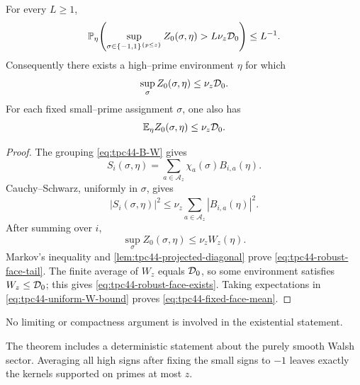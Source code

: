 \begin{theorem}
\label{thm:tpc44-robust-face}
For every \(L\ge1\),
\begin{equation}
 \mathbb P_\eta\!\left(
  \sup_{\sigma\in\{-1,1\}^{\{p\le z\}}}
  Z_0(\sigma,\eta)>L\nu_z\mathcal D_0
 \right)
 \le L^{-1}.
 \label{eq:tpc44-robust-face-tail}
\end{equation}
Consequently there exists a high--prime environment \(\eta\) for which
\begin{equation}
 \sup_\sigma Z_0(\sigma,\eta)\le\nu_z\mathcal D_0.
 \label{eq:tpc44-robust-face-exists}
\end{equation}
For each fixed small--prime assignment \(\sigma\), one also has
\begin{equation}
 \mathbb E_\eta Z_0(\sigma,\eta)\le\nu_z\mathcal D_0.
 \label{eq:tpc44-fixed-face-mean}
\end{equation}
\end{theorem}

\begin{proof}
The grouping \eqref{eq:tpc44-B-W} gives
\begin{equation}
 S_i(\sigma,\eta)
 =\sum_{a\in\mathcal A_z}\chi_a(\sigma)B_{i,a}(\eta).
 \label{eq:tpc44-grouped-coordinate}
\end{equation}
Cauchy--Schwarz, uniformly in \(\sigma\), gives
\begin{equation}
 |S_i(\sigma,\eta)|^2
 \le \nu_z\sum_{a\in\mathcal A_z}|B_{i,a}(\eta)|^2.
 \label{eq:tpc44-coordinate-Cauchy}
\end{equation}
After summing over \(i\),
\begin{equation}
 \sup_\sigma Z_0(\sigma,\eta)\le\nu_zW_z(\eta).
 \label{eq:tpc44-uniform-W-bound}
\end{equation}
Markov's inequality and \cref{lem:tpc44-projected-diagonal} prove
\eqref{eq:tpc44-robust-face-tail}.  The finite average of \(W_z\)
equals \(\mathcal D_0\), so some environment satisfies \(W_z\le\mathcal D_0\); this gives
\eqref{eq:tpc44-robust-face-exists}.  Taking expectations in
\eqref{eq:tpc44-uniform-W-bound} proves
\eqref{eq:tpc44-fixed-face-mean}.
\end{proof}

No limiting or compactness argument is involved in the existential
statement.

The theorem includes a deterministic statement about the purely smooth
Walsh sector.  Averaging all high signs after fixing the small signs to
\(-1\) leaves exactly the kernels supported on primes at most \(z\).

